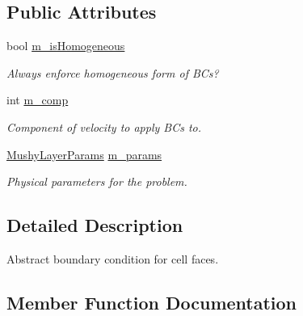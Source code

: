 \subsection*{Public Attributes}
\begin{DoxyCompactItemize}
\item 
\mbox{\label{class_abstract_face_b_c_function_a68fdad0aa96f41e116e78f7488c9f747}} 
bool \hyperlink{class_abstract_face_b_c_function_a68fdad0aa96f41e116e78f7488c9f747}{m\+\_\+is\+Homogeneous}
\begin{DoxyCompactList}\small\item\em Always enforce homogeneous form of B\+Cs? \end{DoxyCompactList}\item 
\mbox{\label{class_abstract_face_b_c_function_ac626713cfdda3f62b9cece48abe03f2e}} 
int \hyperlink{class_abstract_face_b_c_function_ac626713cfdda3f62b9cece48abe03f2e}{m\+\_\+comp}
\begin{DoxyCompactList}\small\item\em Component of velocity to apply B\+Cs to. \end{DoxyCompactList}\item 
\mbox{\label{class_abstract_face_b_c_function_afe26ef4a7478bd64803699643d3dc11f}} 
\hyperlink{class_mushy_layer_params}{Mushy\+Layer\+Params} \hyperlink{class_abstract_face_b_c_function_afe26ef4a7478bd64803699643d3dc11f}{m\+\_\+params}
\begin{DoxyCompactList}\small\item\em Physical parameters for the problem. \end{DoxyCompactList}\end{DoxyCompactItemize}


\subsection{Detailed Description}
Abstract boundary condition for cell faces. 

\subsection{Member Function Documentation}
\mbox{\label{class_abstract_face_b_c_function_a176156d1142b51236652bbde0dee520a}} 
